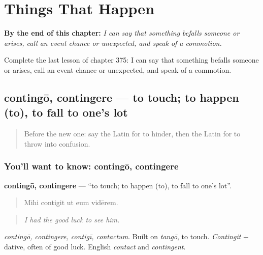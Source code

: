 
\chapter{Things That Happen}
\label{ch:la-things-that-happen}

\begin{chapteropening}
\textbf{By the end of this chapter:} \emph{I can say that something befalls someone or arises, call an event chance or unexpected, and speak of a commotion.}

Complete the last lesson of chapter 375: I can say that something befalls someone or arises, call an event chance or unexpected, and speak of a commotion.
\end{chapteropening}

\section[contingō, contingere]{contingō, contingere — to touch; to happen (to), to fall to one's lot}

\label{lesson:LA-C375-contingo}



\begin{quote}
Before the new one: say the Latin for to hinder, then the Latin for to throw into confusion.
\end{quote}

\subsection*{You'll want to know: contingō, contingere}
\textbf{contingō, contingere} — \textquotedblleft{}to touch; to happen (to), to fall to one's lot\textquotedblright{}.

\begin{quote}
Mihi contigit ut eum vidērem.
\end{quote}

\begin{quote}
\emph{I had the good luck to see him.}
\end{quote}

\emph{contingō, contingere, contigī, contactum}. Built on \emph{tangō}, to touch. \emph{Contingit} + dative, often of good luck. English \emph{contact} and \emph{contingent}.

